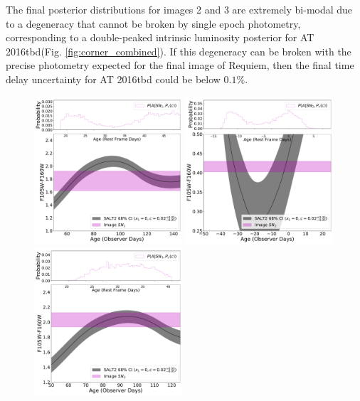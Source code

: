 \documentclass[12pt]{article}
\def\SNABC{AT 2016tbd\xspace}
\begin{document}
The final posterior distributions for images 2 and 3 are extremely bi-modal due to a degeneracy that cannot be broken by single epoch photometry, corresponding to a double-peaked intrinsic luminosity posterior for \SNABC (Fig. \ref{fig:corner_combined}). If this degeneracy can be broken with the precise photometry expected for the final image of Requiem, then the final time delay uncertainty for \SNABC could be below $0.1\%$.


\begin{figure}
    \centering
    \includegraphics[width=0.49\textwidth]{Paper/Figures/colorcurve_image1.pdf}
    \includegraphics[width=0.49\textwidth]{Paper/Figures/colorcurve_image2.pdf}
    \includegraphics[width=0.49\textwidth]{Paper/Figures/colorcurve_image3.pdf}

\end{figure}
\end{document}
